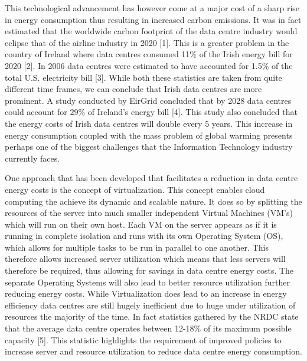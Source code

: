 \documentclass[oneside,12pt]{Classes/RoboticsLaTeX}
\begin{document}
This technological advancement has however come at a major cost of a sharp rise in energy consumption thus resulting in increased carbon emissions. It was in fact estimated that the worldwide carbon footprint of the data centre industry would eclipse that of the airline industry in 2020 [1]. This is a greater problem in the country of Ireland where data centres consumed 11\% of the Irish energy bill for 2020 [2]. In 2006 data centres were estimated to have accounted for 1.5\% of the total U.S. electricity bill [3]. While both these statistics are taken from quite different time frames, we can conclude that Irish data centres are more prominent. A study conducted by EirGrid concluded that by 2028 data centres could account for 29\% of Ireland's energy bill [4]. This study also concluded that the energy costs of Irish data centres will double every 5 years. This increase in energy consumption coupled with the mass problem of global warming presents perhaps one of the biggest challenges that the Information Technology industry currently faces. 

One approach that has been developed that facilitates a reduction in data centre energy costs is the concept of virtualization. This concept enables cloud computing the achieve its dynamic and scalable nature. It does so by splitting the resources of the server into much smaller independent Virtual Machines (VM's) which will run on their own host. Each VM on the server appears as if it is running in complete isolation and runs with its own Operating System (OS), which allows for multiple tasks to be run in parallel to one another. This therefore allows increased server utilization which means that less servers will therefore be required, thus allowing for savings in data centre energy costs. The separate Operating Systems will also lead to better resource utilization further reducing energy costs. While Virtualization does lead to an increase in energy efficiency data centres are still hugely inefficient due to huge under utilization of resources the majority of the time. In fact statistics gathered by the NRDC state that the average data centre operates between 12-18\% of its maximum possible capacity [5]. This statistic highlights the requirement of improved policies to increase server and resource utilization to reduce data centre energy consumption.
\end{document}
